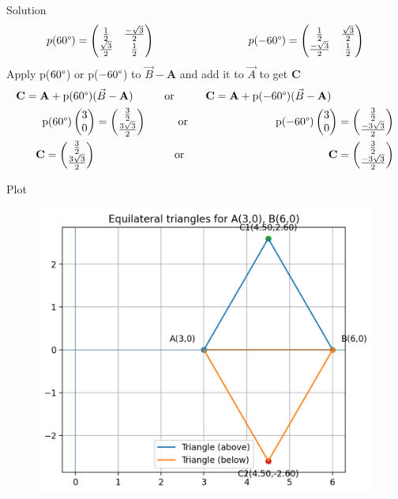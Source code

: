 \documentclass{beamer}
\numberwithin{equation}{section}
\theoremstyle{remark}
\newcommand{\myvec}[1]{\ensuremath{\begin{pmatrix}#1\end{pmatrix}}}
\let\vec\mathbf
\begin{document}
\begin{frame}{Solution}
\begin{align}
    p(60\degree)=\myvec{
   \frac{1}{2} & \frac{-\sqrt{3}}{2}
    \\
   \frac{\sqrt{3}}{2} & \frac{1}{2}
   } \hspace{3cm}
   p(-60\degree)=\myvec{
   \frac{1}{2} & \frac{\sqrt{3}}{2}
    \\
   \frac{-\sqrt{3}}{2} & \frac{1}{2}
   }\\
\end{align}
Apply p($60\degree$) or p($-60\degree$) to $\Vec{B}-\vec{A}$ and add it to $\Vec{A}$ to get $\vec{C}$\\
\begin{align}
    \vec{C}=\vec{A}+\text{p}(60\degree)(\Vec{B}-\vec{A})\hspace{1cm} \text{or} \hspace{1cm}\vec{C}=\vec{A}+\text{p}(-60\degree)(\Vec{B}-\vec{A})\hspace{2cm}\\
    \text{p}(60\degree)\myvec{3\\0}=\myvec{\frac{3}{2}\\\frac{3\sqrt{3}}{2}} \hspace{1cm} \text{or} \hspace{2.8cm} \text{p}(-60\degree)\myvec{3\\0}=\myvec{\frac{3}{2}\\\frac{-3\sqrt{3}}{2}}\\
    \vec{C}=\myvec{\frac{3}{2}\\\frac{3\sqrt{3}}{2}} \hspace{2.5cm} \text{or} \hspace{4.6cm} \vec{C}=\myvec{\frac{3}{2}\\\frac{-3\sqrt{3}}{2}}
\end{align}
\end{frame}

\begin{frame}{Plot}
    \begin{figure}[H]
    \centering
    \includegraphics[width=0.7\columnwidth]{figs/01.png}
    \label{fig-1}
\end{figure}
\end{frame}
\end{document}
